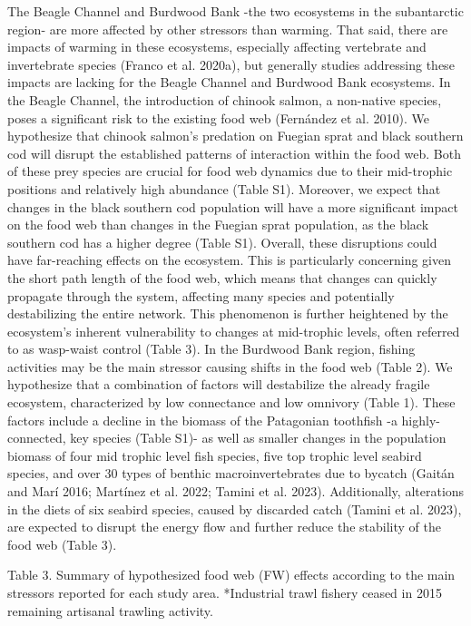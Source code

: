 \documentclass[
]{article}
\begin{document}
The Beagle Channel and Burdwood Bank -the two ecosystems in the
subantarctic region- are more affected by other stressors than warming.
That said, there are impacts of warming in these ecosystems, especially
affecting vertebrate and invertebrate species (Franco et al. 2020a), but
generally studies addressing these impacts are lacking for the Beagle
Channel and Burdwood Bank ecosystems. In the Beagle Channel, the
introduction of chinook salmon, a non-native species, poses a
significant risk to the existing food web (Fernández et al. 2010). We
hypothesize that chinook salmon's predation on Fuegian sprat and black
southern cod will disrupt the established patterns of interaction within
the food web. Both of these prey species are crucial for food web
dynamics due to their mid-trophic positions and relatively high
abundance (Table S1). Moreover, we expect that changes in the black
southern cod population will have a more significant impact on the food
web than changes in the Fuegian sprat population, as the black southern
cod has a higher degree (Table S1). Overall, these disruptions could
have far-reaching effects on the ecosystem. This is particularly
concerning given the short path length of the food web, which means that
changes can quickly propagate through the system, affecting many species
and potentially destabilizing the entire network. This phenomenon is
further heightened by the ecosystem's inherent vulnerability to changes
at mid-trophic levels, often referred to as wasp-waist control (Table
3). In the Burdwood Bank region, fishing activities may be the main
stressor causing shifts in the food web (Table 2). We hypothesize that a
combination of factors will destabilize the already fragile ecosystem,
characterized by low connectance and low omnivory (Table 1). These
factors include a decline in the biomass of the Patagonian toothfish -a
highly-connected, key species (Table S1)- as well as smaller changes in
the population biomass of four mid trophic level fish species, five top
trophic level seabird species, and over 30 types of benthic
macroinvertebrates due to bycatch (Gaitán and Marí 2016; Martínez et al.
2022; Tamini et al. 2023). Additionally, alterations in the diets of six
seabird species, caused by discarded catch (Tamini et al. 2023), are
expected to disrupt the energy flow and further reduce the stability of
the food web (Table 3).

\scriptsize

Table 3. Summary of hypothesized food web (FW) effects according to the
main stressors reported for each study area. *Industrial trawl fishery
ceased in 2015 remaining artisanal trawling activity.
\end{document}

